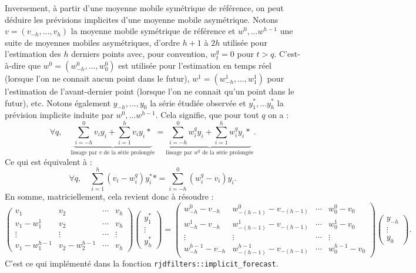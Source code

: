 \documentclass[
  11pt,
  french,
  a4paper]{article}
\newcommand\1{\mathds{1}}
\begin{document}
Inversement, à partir d'une moyenne mobile symétrique de référence, on peut déduire les prévisions implicites d'une moyenne mobile asymétrique.
Notons \(v=(v_{-h},\dots, v_{h})\) la moyenne mobile symétrique de référence et \(w^0,\dots w^{h-1}\) une suite de moyennes mobiles asymétriques, d'ordre \(h+1\) à \(2h\) utilisée pour l'estimation des \(h\) derniers points avec, pour convention, \(w_t^q=0\) pour \(t>q\).
C'est-à-dire que \(w^0=(w_{-h}^0,\dots, w_{0}^0)\) est utilisée pour l'estimation en temps réel (lorsque l'on ne connait aucun point dans le futur), \(w^1=(w_{-h}^1,\dots, w_{1}^1)\) pour l'estimation de l'avant-dernier point (lorsque l'on ne connait qu'un point dans le futur), etc.
Notons également \(y_{-h},\dots,y_{0}\) la série étudiée observée et \(y_{1}^*,\dots y_h^*\) la prévision implicite induite par \(w^0,\dots w^{h-1}\).
Cela signifie, que pour tout \(q\) on a :
\[
\forall q, \quad \underbrace{\sum_{i=-h}^0 v_iy_i + \sum_{i=1}^h v_iy_i*}_{\text{lissage par }v\text{ de la série prolongée}}
=\underbrace{\sum_{i=-h}^0 w_i^qy_i + \sum_{i=1}^h w_i^qy_i*}_{\text{lissage par }w^q\text{ de la série prolongée}}.
\]
Ce qui est équivalent à :
\[
\forall q, \quad \sum_{i=1}^h (v_i- w_i^q) y_i^**
=\sum_{i=-h}^0 (w_i^q-v_i)y_i.
\]
En somme, matriciellement, cela revient donc à résoudre :
\[
\begin{pmatrix}
  v_1 & v_2 & \cdots & v_h \\
  v_1 - w_1^1 & v_2 & \cdots & v_h \\
  \vdots & \vdots & \cdots & \vdots \\ 
   v_1 - w_1^{h-1} & v_2-w_2^{h-1} & \cdots & v_h 
\end{pmatrix}
\begin{pmatrix}y_1^* \\ \vdots \\ y_h^*\end{pmatrix}=
\begin{pmatrix}
  w_{-h}^0 - v_{-h} & w_{-(h-1)}^0 - v_{-(h-1)} & \cdots & w_{0}^0 - v_{0} \\
  w_{-h}^1 - v_{-h} & w_{-(h-1)}^1 - v_{-(h-1)} & \cdots & w_{0}^1 - v_{0} \\
  \vdots & \vdots & \cdots & \vdots \\ 
  w_{-h}^{h-1} - v_{-h} & w_{-(h-1)}^{h-1} - v_{-(h-1)} & \cdots & w_{0}^{h-1} - v_{0}
\end{pmatrix}
\begin{pmatrix}y_{-h} \\ \vdots \\ y_0\end{pmatrix}.
\]
C'est ce qui implémenté dans la fonction \texttt{rjdfilters::implicit\_forecast}.
\end{document}
